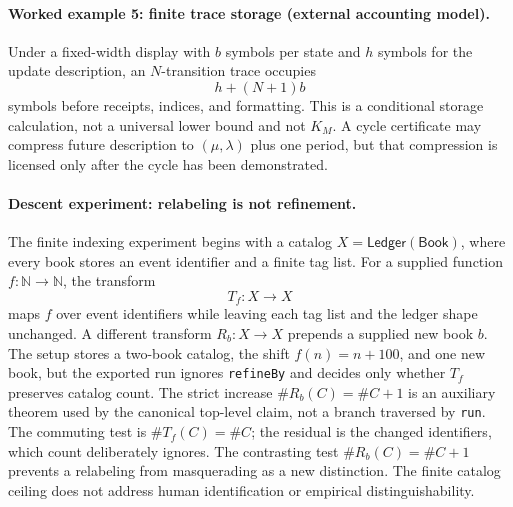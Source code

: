 \paragraph{Worked example 5: finite trace storage (external accounting model).}
Under a fixed-width display with \(b\) symbols per state and \(h\) symbols for the update description, an
\(N\)-transition trace occupies
\[
                          h+(N+1)b
\]
symbols before receipts, indices, and formatting.  This is a conditional storage calculation, not a universal lower
bound and not \(K_M\).  A cycle certificate may compress future description to \((\mu,\lambda)\) plus one period, but
that compression is licensed only after the cycle has been demonstrated.

\paragraph{Descent experiment: relabeling is not refinement.}
The finite indexing experiment begins with a catalog \(X=\mathsf{Ledger}(\mathsf{Book})\), where every book stores an event identifier and a finite tag list.
For a supplied function \(f:\mathbb N\to\mathbb N\), the transform
\[
 T_f:X\longrightarrow X
\]
maps \(f\) over event identifiers while leaving each tag list and the ledger shape unchanged.
A different transform \(R_b:X\to X\) prepends a supplied new book \(b\).
The setup stores a two-book catalog, the shift \(f(n)=n+100\), and one new book, but the exported run ignores \texttt{refineBy} and decides only whether \(T_f\) preserves catalog count.
The strict increase \(\#R_b(C)=\#C+1\) is an auxiliary theorem used by the canonical top-level claim, not a branch traversed by \texttt{run}.
The commuting test is \(\#T_f(C)=\#C\); the residual is the changed identifiers, which count deliberately ignores.
The contrasting test \(\#R_b(C)=\#C+1\) prevents a relabeling from masquerading as a new distinction.
The finite catalog ceiling does not address human identification or empirical distinguishability.

